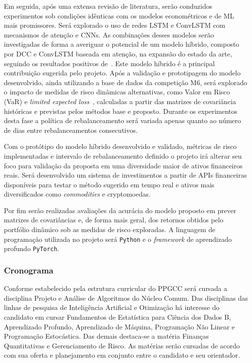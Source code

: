 \documentclass[a4paper, 12pt]{article}
\begin{document}
\begin{spacing}{.9}
Em seguida, após uma extensa revisão de literatura, serão conduzidos
experimentos sob condições idênticas com os modelos econométricos e de ML mais
promissores. Será explorado o uso de redes LSTM e ConvLSTM com mecanismos de
atenção e CNNs. As combinações desses modelos serão investigadas de forma a
averiguar o potencial de um modelo híbrido, composto por DCC e ConvLSTM baseada
em atenção, na expansão do estado da arte, seguindo os resultados positivos
de~\cite{dl_multi}. Este modelo híbrido é a principal contribuição sugerida
pelo projeto. Após a validação e prototipagem do modelo desenvolvido, ainda
utilizando a base de dados da competição M6, será explorado o impacto de
medidas de risco dinâmicas alternativas, como Valor em Risco (VaR) e
\emph{limited expected loss}~\cite{gambrah2014risk}, calculadas a partir das
matrizes de covariância históricas e previstas pelos métodos base e proposto.
Durante os experimentos desta fase a política de rebalanceamento será variada
apenas quanto ao número de dias entre rebalanceamentos consecutivos.

Com o protótipo do modelo híbrido desenvolvido e validado, métricas de risco
implementadas e intervalo de rebalanceamento definido o projeto irá alterar seu
foco para validação da proposta em uma diversidade maior de ativos financeiros
reais. Será desenvolvido um sistema de investimentos a partir de APIs
financeiras disponíveis para testar o método sugerido em tempo real e ativos
mais diversificados como \emph{commodities} e cryptomoedas.

Por fim serão realizadas avaliações da acurácia do modelo proposto em prever
matrizes de covariâncias e, de forma mais geral, dos retornos obtidos pelo
portfólio dinâmico sob as medidas de risco exploradas. A linguagem de
programação utilizada no projeto será \verb+Python+ e o \emph{framework} de
aprendizado profundo \verb+PyTorch+.

\subsubsection*{Cronograma}

Conforme estabelecido pela estrutura curricular do PPGCC será cursada a
disciplina Projeto e Análise de Algoritmos do Núcleo Comum. Das disciplinas das
linhas de pesquisa de Inteligência Artificial e Otimização há interesse do
candidato em cursar Fundamentos de Estatística para Ciência dos Dados B,
Aprendizado Profundo, Aprendizado de Máquina, Programação Não Linear e
Programação Estocástica. Das demais destaca-se a matéria Finanças Quantitativas
e Gerenciamento de Risco. As matérias serão cursadas de acordo com sua oferta e
planejamento em conjunto entre o candidato e seu orientador.


\end{spacing}
\end{document}
